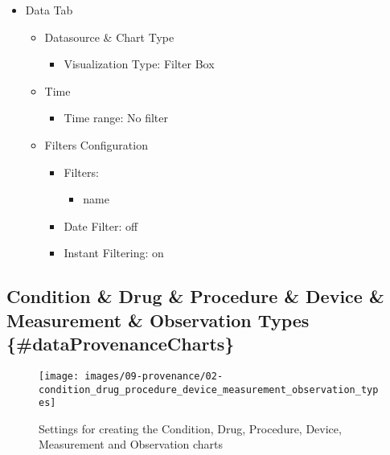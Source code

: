 \documentclass[
]{book}
\providecommand{\tightlist}{%
  \setlength{\itemsep}{0pt}\setlength{\parskip}{0pt}}
\begin{document}
\begin{itemize}
\tightlist
\item
  Data Tab

  \begin{itemize}
  \tightlist
  \item
    Datasource \& Chart Type

    \begin{itemize}
    \tightlist
    \item
      Visualization Type: Filter Box
    \end{itemize}
  \item
    Time

    \begin{itemize}
    \tightlist
    \item
      Time range: No filter
    \end{itemize}
  \item
    Filters Configuration

    \begin{itemize}
    \tightlist
    \item
      Filters:

      \begin{itemize}
      \tightlist
      \item
        name
      \end{itemize}
    \item
      Date Filter: off
    \item
      Instant Filtering: on
    \end{itemize}
  \end{itemize}
\end{itemize}

\hypertarget{condition-drug-procedure-device-measurement-observation-types-dataprovenancecharts}{%
\subsection*{Condition \& Drug \& Procedure \& Device \& Measurement \& Observation Types \{\#dataProvenanceCharts\}}\label{condition-drug-procedure-device-measurement-observation-types-dataprovenancecharts}}

\begin{figure}
\texttt{[image: images/09-provenance/02-condition\_drug\_procedure\_device\_measurement\_observation\_types]} \caption{Settings for creating the Condition, Drug, Procedure, Device, Measurement and Observation charts}\label{fig:conditionDrugProcedureDeviceMeasurementObservationTypes}
\end{figure}
\end{document}
